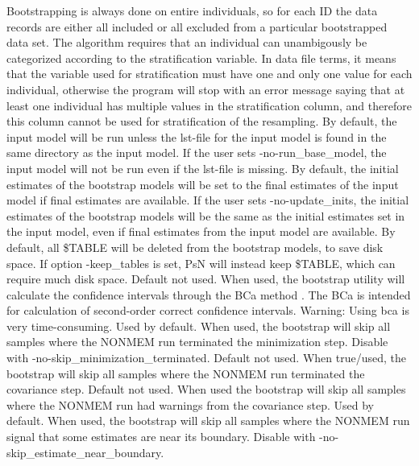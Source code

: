 \begin{optionlist}
Bootstrapping is always done on entire individuals, so for each ID the data records are either all included or all excluded from a particular bootstrapped data set.
The algorithm requires that an individual can unambigously be categorized according to the stratification variable. 
In data file terms, it means that the variable used for stratification must have one and only one value for each individual, otherwise the program will stop with an error message saying that at least one individual has multiple values
in the stratification column, and therefore this column cannot be used for stratification of the resampling.
\nextopt
{}
By default, the input model will be run unless the lst-file for the input model is found in the same directory as the input model.
If the user sets -no-run\_base\_model, the input model will not be run even if the lst-file is missing.
By default, the initial estimates of the bootstrap models will be set to the final estimates of the input model if final
estimates are available. If the user sets -no-update\_inits, the initial estimates of the bootstrap models will be
the same as the initial estimates set in the input model, even if final estimates from the input model are available.
By default, all \$TABLE will be deleted from the bootstrap models, to save disk space. If option -keep\_tables is set, 
PsN will instead keep \$TABLE, which can require much disk space.
\nextopt
{}
Default not used. When used, the bootstrap utility will calculate the confidence intervals through the BCa method \cite{Efron}. The BCa is intended for calculation of second-order correct confidence intervals. Warning: Using bca is very time-consuming. 
\nextopt
{}
Used by default. When used, the bootstrap will skip all samples where the NONMEM run terminated the minimization step.
Disable with -no-skip\_minimization\_terminated. 
\nextopt
{}
Default not used. When true/used, the bootstrap will skip all samples where the NONMEM run terminated the covariance step. 
\nextopt
{}
Default not used. When used the bootstrap will skip all samples where the NONMEM run had warnings from the covariance step. 
\nextopt
{}
Used by default. When used, the bootstrap will skip all samples where the NONMEM run signal that some estimates are near its boundary.
Disable with -no-skip\_estimate\_near\_boundary.
\nextopt
{}

\end{optionlist}
